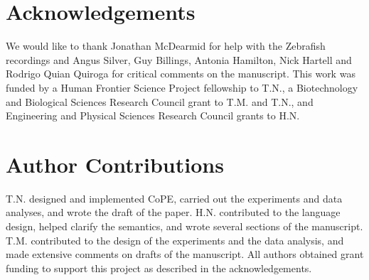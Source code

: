 \section*{Acknowledgements} 

We would like to thank Jonathan McDearmid for help with the Zebrafish
recordings and Angus Silver, Guy Billings, Antonia Hamilton, Nick
Hartell and Rodrigo Quian Quiroga for critical comments on the
manuscript. This work was funded by a Human Frontier Science Project
fellowship to T.N., a Biotechnology and Biological Sciences Research
Council grant to T.M. and T.N., and Engineering and Physical Sciences Research
Council grants to H.N.

\section*{Author Contributions}  
T.N. designed and implemented CoPE, carried out the experiments and
data analyses, and wrote the draft of the paper. H.N. contributed to
the language design, helped clarify the semantics, and wrote several
sections of the manuscript. T.M. contributed to the design of the
experiments and the data analysis, and made extensive comments on
drafts of the manuscript. All authors obtained grant funding to
support this project as described in the acknowledgements.


